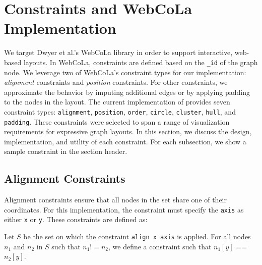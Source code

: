 \section{\projectname Constraints and WebCoLa Implementation}
\label{sec:constraints}

We target  Dwyer et al.'s WebCoLa library \cite{WebCoLa} in order to support
interactive, web-based layouts.
In WebCoLa, constraints are defined based on the \texttt{\_id} of the
graph node. We leverage two of WebCoLa's
constraint types for our implementation: \emph{alignment} constraints 
and \emph{position} constraints. For other \projectname constraints, we
approximate the behavior by imputing additional edges or by applying
padding to the nodes in the layout. The current implementation of
\projectname provides seven constraint types:
\texttt{alignment}, \texttt{position}, \texttt{order}, \texttt{circle},
\texttt{cluster}, \texttt{hull}, and \texttt{padding}. These constraints
were selected to span a range of visualization requirements for expressive
graph layouts. In this section, we discuss the design, implementation, 
and utility of each \projectname constraint. For each subsection, we show 
a sample \projectname constraint in the section header.

\subsection{Alignment Constraints}

Alignment constraints ensure that all nodes in the set share one of their
coordinates. For this implementation, the constraint must specify the \texttt{axis}
as either \texttt{x} or \texttt{y}. These constraints are defined as:

\begin{definition}
Let $S$ be the set on which the constraint \texttt{align x axis} is applied.
For all nodes $n_1$ and $n_2$ in $S$ such that $n_1 != n_2$, we define 
a constraint such that $n_1[y]$ == $n_2[y]$.
\end{definition}



